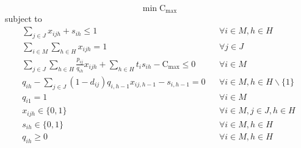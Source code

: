 \documentclass[a4paper,11pt]{article}
\begin{document}
\begin{equation}\label{eq:fo_mod1}
	\min \text{C}_{\max}
\end{equation}
\qquad subject to
\begin{eqnarray}	
\label{eq:uniqueAct_mod1} \sum_{j \in J}{x_{ijh}} +  s_{ih} \leq 1 && \forall i \in M, h \in H \\
\label{eq:mandJob_mod1}	 \sum_{i \in M}\sum_{h \in H}{x_{ijh}} = 1 && \forall j \in J \\ 
\label{eq:cMax_mod1} \sum_{j \in J}\sum_{h \in H}{\frac{p_{ij}}{q_{ih}}x_{ijh}} + \sum_{h \in H}{t_i} s_{ih} - \text{C}_{\max} \leq 0 && \forall i \in M \\ 
\label{eq:det_mod1}	q_{ih} - \sum_{j \in J}(1-d_{ij})q_{i,h-1}x_{ij,h-1} - s_{i,h-1} = 0 && \forall i \in M, h \in H\backslash\{1\} \\ 
\label{eq:qInit_mod1} q_{i1} = 1 && \forall i \in M \\ 
\label{eq:xDef_mod1}    x_{ijh} \in \{0,1\} && \forall i \in M, j \in J, h \in H \\ 
\label{eq:dDef_mod1}    s_{ih} \in \{0,1\} && \forall i \in M, h \in H \\ 
\label{eq:qDef_mod1}    q_{ih} \geq 0 && \forall  i \in M, h \in H
\end{eqnarray}
\end{document}
